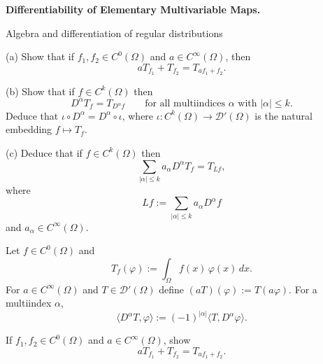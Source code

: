 \begin{problem}[CP-II-0099]
\label{prob:cp-ii-0099}
\textbf{Differentiability of Elementary Multivariable Maps.}

\hspace*{1.5em}Algebra and differentiation of regular distributions

\noindent
(a)\; Show that if $f_1,f_2\in C^0(\Omega)$ and $a\in C^\infty(\Omega)$, then
\[
aT_{f_1} + T_{f_2} = T_{a f_1 + f_2}.
\]

\medskip\noindent
(b)\; Show that if $f\in C^k(\Omega)$ then
\[
D^\alpha T_f = T_{D^\alpha f}
\qquad\text{for all multiindices }\alpha\text{ with }|\alpha|\le k.
\]
Deduce that $\iota\circ D^\alpha = D^\alpha\circ\iota$, where
$\iota:C^k(\Omega)\to\mathcal{D}'(\Omega)$ is the natural embedding
$f\mapsto T_f$.

\medskip\noindent
(c)\; Deduce that if $f\in C^k(\Omega)$ then
\[
\sum_{|\alpha|\le k} a_\alpha D^\alpha T_f = T_{Lf},
\]
where
\[
Lf := \sum_{|\alpha|\le k} a_\alpha D^\alpha f
\]
and $a_\alpha\in C^\infty(\Omega)$.

\bigskip

Let $f\in C^0(\Omega)$ and
\[
T_f(\varphi) := \int_\Omega f(x)\,\varphi(x)\,dx.
\]
For $a\in C^\infty(\Omega)$ and $T\in\mathcal{D}'(\Omega)$ define
$(aT)(\varphi):=T(a\varphi)$. For a multiindex $\alpha$,
\[
\langle D^\alpha T,\varphi\rangle
:= (-1)^{|\alpha|}\langle T,D^\alpha\varphi\rangle.
\]

If $f_1,f_2\in C^0(\Omega)$ and $a\in C^\infty(\Omega)$, show
\[
aT_{f_1} + T_{f_2} = T_{af_1+f_2}.
\]
\end{problem}

